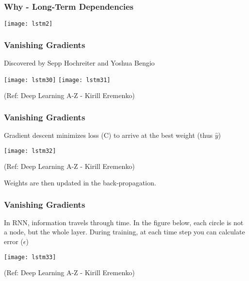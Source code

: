 \begin{frame}[fragile] \frametitle{Why - Long-Term Dependencies}
\begin{center}
\texttt{[image: lstm2]}
\end{center}
\end{frame}

\begin{frame}[fragile] \frametitle{Vanishing Gradients}

Discovered by Sepp Hochreiter and Yoshua Bengio

\begin{center}
\texttt{[image: lstm30]}
\texttt{[image: lstm31]}

\tiny{(Ref: Deep Learning A-Z - Kirill Eremenko)}
\end{center}


\end{frame}

\begin{frame}[fragile] \frametitle{Vanishing Gradients}

Gradient descent minimizes loss (C) to arrive at the best weight (thus $\hat{y}$)

\begin{center}
\texttt{[image: lstm32]}


\tiny{(Ref: Deep Learning A-Z - Kirill Eremenko)}
\end{center}

Weights are then updated in the back-propagation.

\end{frame}

\begin{frame}[fragile] \frametitle{Vanishing Gradients}

In RNN, information travels through time. In the figure below, each circle is not a node, but the whole layer.
During training, at each time step you can calculate error ($\epsilon$)

\begin{center}
\texttt{[image: lstm33]}


\tiny{(Ref: Deep Learning A-Z - Kirill Eremenko)}
\end{center}

\end{frame}

